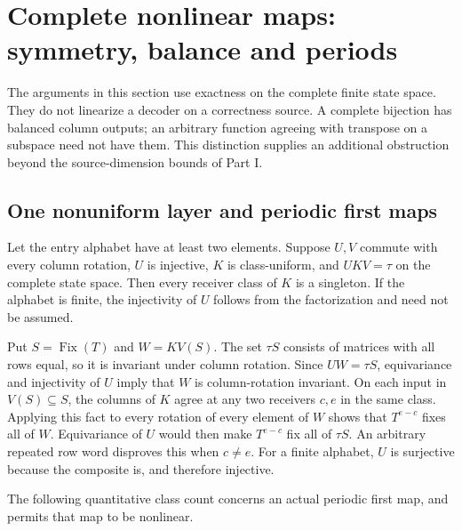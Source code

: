 \section{Complete nonlinear maps: symmetry, balance and periods}
\label{sec:nonlinear}

The arguments in this section use exactness on the complete finite state
space.  They do not linearize a decoder on a correctness source.  A complete
bijection has balanced column outputs; an arbitrary function agreeing with
transpose on a subspace need not have them.  This distinction supplies an
additional obstruction beyond the source-dimension bounds of Part I.

\subsection{One nonuniform layer and periodic first maps}

\begin{theorem}\label{thm:uniform-sandwich}
Let the entry alphabet have at least two elements.  Suppose $U,V$ commute
with every column rotation, $U$ is injective, $K$ is class-uniform, and
$UKV=\tau$ on the complete state space.  Then every receiver class of $K$
is a singleton.  If the alphabet is finite, the injectivity of $U$ follows
from the factorization and need not be assumed.
\end{theorem}
\begin{outline}
Put $S=\operatorname{Fix}(T)$ and $W=KV(S)$.  The set $\tau S$ consists
of matrices with all rows equal, so it is invariant under column rotation.
Since $UW=\tau S$, equivariance and injectivity of $U$ imply that $W$ is
column-rotation invariant.  On each input in $V(S)\subseteq S$, the columns
of $K$ agree at any two receivers $c,e$ in the same class.  Applying this
fact to every rotation of every element of $W$ shows that $T^{e-c}$ fixes
all of $W$.  Equivariance of $U$ would then make $T^{e-c}$ fix all of
$\tau S$.  An arbitrary repeated row word disproves this when $c\ne e$.
For a finite alphabet, $U$ is surjective because the composite is, and
therefore injective.
\end{outline}

The following quantitative class count concerns an actual periodic first
map, and permits that map to be nonlinear.

